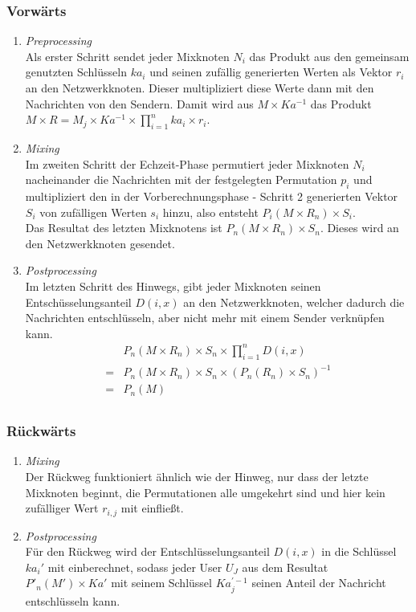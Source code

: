 \documentclass[
    fontsize=12pt,
    headings=small,
    parskip=half,           %
    bibliography=totoc,
    numbers=noenddot,       %
    open=any,               %
    final                   %
    ]{scrreprt}
\begin{document}
\subsubsection{Vorwärts}
\begin{enumerate}
	\item \textit{Preprocessing} \\
	Als erster Schritt sendet jeder Mixknoten $N_i$ das Produkt aus den gemeinsam genutzten Schlüsseln $ka_i$ und seinen zufällig generierten Werten als Vektor $r_i$ an den Netzwerkknoten.
Dieser multipliziert diese Werte dann mit den Nachrichten von den Sendern.
Damit wird aus $M \times Ka^{-1}$ das Produkt \(M \times R = M_j \times Ka^{-1} \times \prod_{i=1}^{n} ka_{i} \times r_i \).
	
	\item \textit{Mixing} \\
	Im zweiten Schritt der Echzeit-Phase permutiert jeder Mixknoten $N_i$ nacheinander die Nachrichten mit der festgelegten Permutation $p_i$ und multipliziert den in der Vorberechnungsphase - Schritt 2 generierten Vektor $S_i$ von zufälligen Werten $s_i$ hinzu, also entsteht
	\(P_i (M \times R_n) \times S_i\).\\
Das Resultat des letzten Mixknotens ist \(P_n(M \times R_n) \times S_n\).
Dieses wird an den Netzwerkknoten gesendet.

	
	\item \textit{Postprocessing} \\
Im letzten Schritt des Hinwegs, gibt jeder Mixknoten seinen Entschüsselungsanteil $D(i,x)$ an den Netzwerkknoten, welcher dadurch die Nachrichten entschlüsseln, aber nicht mehr mit einem Sender verknüpfen kann.
\begin{eqnarray*}
&P_n (M \times R_n) \times S_n \times \prod_{i=1}^n D(i,x)  \\
=& P_n(M \times R_n) \times S_n \times  (P_n(R_n) \times S_n)^{-1}  \\
=& P_n(M)  \\
\end{eqnarray*}
\end{enumerate}
\subsubsection{Rückwärts}
\begin{enumerate}
	\item \textit{Mixing} \\
	Der Rückweg funktioniert ähnlich wie der Hinweg, nur dass der letzte Mixknoten beginnt, die Permutationen alle umgekehrt sind und hier kein zufälliger Wert
	$r_{i,j}$ mit einfließt.
	
	
	\item \textit{Postprocessing} \\
	Für den Rückweg wird der Entschlüsselungsanteil  \(D(i,x)\)
	 in die Schlüssel \(ka_i'\) mit einberechnet, sodass jeder User \(U_J\) aus dem Resultat \(P'_n(M') \times Ka' \) mit seinem Schlüssel \(Ka_j^{'-1}\) seinen Anteil der Nachricht entschlüsseln kann.



\end{enumerate}
\end{document}
